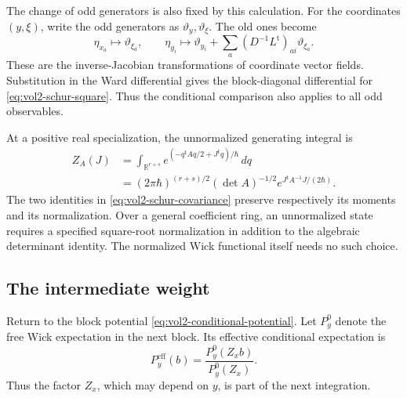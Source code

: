 The change of odd generators is also fixed by this calculation.
For the coordinates $(y,\xi)$, write the odd generators as
$\vartheta_y,\vartheta_\xi$. The old ones become
\[
 \eta_{x_a}\longmapsto\vartheta_{\xi_a},\qquad
 \eta_{y_i}\longmapsto\vartheta_{y_i}
       +\sum_a(D^{-1}L^{\mathrm t})_{ai}\vartheta_{\xi_a}.
\]
These are the inverse-Jacobian transformations of coordinate
vector fields. Substitution in the Ward differential gives
the block-diagonal differential for
\eqref{eq:vol2-schur-square}. Thus the conditional comparison
also applies to all odd observables.

At a positive real specialization, the unnormalized generating
integral is
\begin{equation}\label{eq:vol2-unnormalized-gaussian}
 \begin{split}
 Z_A(J)
 &=\int_{\mathbb R^{r+s}}
        e^{(-q^{\mathrm t}Aq/2+J^{\mathrm t}q)/\hbar}\,dq\\
 &=(2\pi\hbar)^{(r+s)/2}(\det A)^{-1/2}
                       e^{J^{\mathrm t}A^{-1}J/(2\hbar)}.
 \end{split}
\end{equation}
The two identities in \eqref{eq:vol2-schur-covariance} preserve
respectively its moments and its normalization. Over a general
coefficient ring, an unnormalized state requires a specified
square-root normalization in addition to the algebraic
determinant identity. The normalized Wick functional itself
needs no such choice.

\subsection{The intermediate weight}

Return to the block potential
\eqref{eq:vol2-conditional-potential}. Let $P_y^0$ denote the
free Wick expectation in the next block. Its effective
conditional expectation is
\[
 P_y^{\mathrm{eff}}(b)
      =\frac{P_y^0(Z_xb)}{P_y^0(Z_x)}.
\]
Thus the factor $Z_x$, which may depend on $y$, is part of
the next integration.

